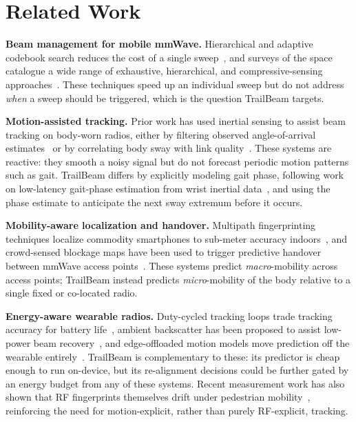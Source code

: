 \section{Related Work}
\textbf{Beam management for mobile mmWave.} Hierarchical and adaptive codebook search reduces the cost of a single sweep~\cite{kastanien2017beamforming}, and surveys of the space catalogue a wide range of exhaustive, hierarchical, and compressive-sensing approaches~\cite{oyelaran2019survey}. These techniques speed up an individual sweep but do not address \emph{when} a sweep should be triggered, which is the question TrailBeam targets.

\textbf{Motion-assisted tracking.} Prior work has used inertial sensing to assist beam tracking on body-worn radios, either by filtering observed angle-of-arrival estimates~\cite{vranic2019imu,kowalczyk2021kalman} or by correlating body sway with link quality~\cite{fennimore2018sway}. These systems are reactive: they smooth a noisy signal but do not forecast periodic motion patterns such as gait. TrailBeam differs by explicitly modeling gait phase, following work on low-latency gait-phase estimation from wrist inertial data~\cite{demirci2020gait}, and using the phase estimate to anticipate the next sway extremum before it occurs.

\textbf{Mobility-aware localization and handover.} Multipath fingerprinting techniques localize commodity smartphones to sub-meter accuracy indoors~\cite{oberholzer2020fingerprint}, and crowd-sensed blockage maps have been used to trigger predictive handover between mmWave access points~\cite{brandsma2022crowd}. These systems predict \emph{macro}-mobility across access points; TrailBeam instead predicts \emph{micro}-mobility of the body relative to a single fixed or co-located radio.

\textbf{Energy-aware wearable radios.} Duty-cycled tracking loops trade tracking accuracy for battery life~\cite{halloran2021energy}, ambient backscatter has been proposed to assist low-power beam recovery~\cite{nakashima2022backscatter}, and edge-offloaded motion models move prediction off the wearable entirely~\cite{lindqvist2023offload}. TrailBeam is complementary to these: its predictor is cheap enough to run on-device, but its re-alignment decisions could be further gated by an energy budget from any of these systems. Recent measurement work has also shown that RF fingerprints themselves drift under pedestrian mobility~\cite{szabo2023rf}, reinforcing the need for motion-explicit, rather than purely RF-explicit, tracking.
